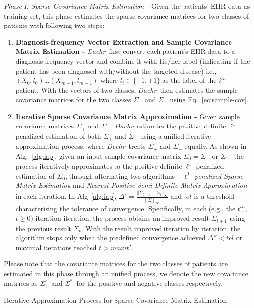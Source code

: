 \documentclass[journal,compsoc]{IEEEtran}
\newcommand{\TheName}{\mbox{\emph{Daehr}}}
\begin{document}
\emph{Phase I: Sparse Covariance Matrix Estimation - } Given the patients' EHR data as training set, this phase estimates the sparse covariance matrices for two classes of patients with following two steps:
\begin{enumerate}
\item \textbf{Diagnosis-frequency Vector Extraction and Sample Covariance Matrix Estimation - } \TheName\ first convert each patient's EHR data to a diagnosis-frequency vector and combine it with his/her label (indicating if the patient has been diagnosed with/without the targeted disease) i.e.,  $(X_0,l_0)\dots (X_{m-1},l_{m-1})$ where $l_i\in\{-1,+1\}$ as the label of the $i^{th}$ patient. With the vectors of two classes, \TheName\ then estimates the sample covariance matrices for the two classes $\Sigma_+$ and $\Sigma_-$ using Eq.~\ref{eq:sample-cov}.

\item \textbf{Iterative Sparse Covariance Matrix Approximation - } Given sample covariance matrices $\Sigma_+$ and $\Sigma_-$, \TheName\ estimates the positive-definite $\ell^1$-penalized estimation of both $\Sigma_+$ and $\Sigma_-$ using a unified iterative approximation process, where \TheName\ treats $\Sigma_+$ and $\Sigma_-$ equally. As shown in Alg.~\ref{alg:iap}, given an input sample covariance matrix $\Sigma_0=\Sigma_+$ or $\Sigma_-$, the process iteratively approximates to the positive definite $\ell^1$-penalized estimation of $\Sigma_0$, through alternating two algorithms -- \emph{$\ell^1$-penalized Sparse Matrix Estimation} and \emph{Nearest Positive Semi-Definite Matrix Approximation} in each iteration. In Alg~\ref{alg:iap}, $\Delta'=\frac{||\Sigma_{t+1}-\Sigma_{t}||_\infty}{||\Sigma_{t}||_\infty}$ and $tol$ is a threshold characterizing the tolerance of convergence. Specifically, in each (e.g., the $t^{th}$, $t\geq 0$) iteration  iteration, the process obtains an improved result $\Sigma_{t+1}$ using the previous result $\Sigma_{t}$. With the result improved iteration by iteration, the algorithm stops only when the predefined convergence achieved $\Delta''< tol$ or maximal iterations reached $t>maxit'$.

\end{enumerate}
Please note that the covariance matrices for the two classes of patients are estimated in this phase through an unified process, we denote the new covariance matrices as $\Sigma_+^*$ and $\Sigma_-^*$ for the positive and negative classes respectively.

\begin{algorithm}
\caption{Iterative Approximation Process for Sparse Covariance Matrix Estimation}
\label{alg:iap}
\end{algorithm}
\end{document}
